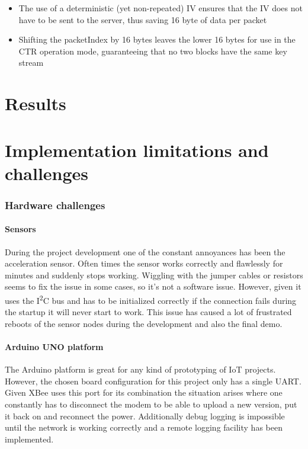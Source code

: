 \documentclass[a4paper,11pt]{scrartcl}
\begin{document}
\begin{itemize}
\item The use of a deterministic (yet non-repeated) IV ensures that the IV does not have to be sent to the server, thus saving 16 byte of data per packet
\item Shifting the packetIndex by 16 bytes leaves the lower 16 bytes for use in the CTR operation mode, guaranteeing that no two blocks have the same key stream
\end{itemize}

\part{Results}

\part{Implementation limitations and challenges}
\section{Hardware challenges}
\subsection{Sensors}\label{subsec:sensors}
During the project development one of the constant annoyances has been the acceleration sensor. Often times the sensor works correctly and flawlessly for minutes and suddenly stops working. Wiggling with the jumper cables or resistors seems to fix the issue in some cases, so it's not a software issue. However, given it uses the I\textsuperscript{2}C bus and has to be initialized correctly if the connection fails during the startup it will never start to work. This issue has caused a lot of frustrated reboots of the sensor nodes during the development and also the final demo.

\subsection{Arduino UNO platform}\label{subsec:uart}
The Arduino platform is great for any kind of prototyping of IoT projects. However, the chosen board configuration for this project only has a single UART. Given XBee uses this port for its combination the situation arises where one constantly has to disconnect the modem to be able to upload a new version, put it back on and reconnect the power. Additionally debug logging is impossible until the network is working correctly and a remote logging facility has been implemented.
\end{document}
